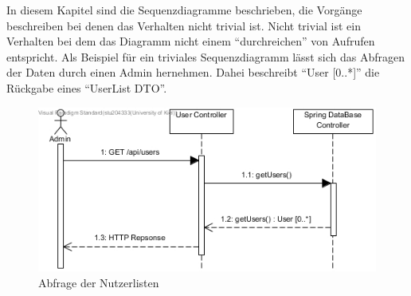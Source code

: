 
In diesem Kapitel sind die Sequenzdiagramme beschrieben, die Vorgänge beschreiben bei denen das Verhalten nicht trivial ist.
Nicht trivial ist ein Verhalten bei dem das Diagramm nicht einem ``durchreichen'' von Aufrufen entspricht.
Als Beispiel für ein triviales Sequenzdiagramm lässt sich das Abfragen der Daten durch einen Admin hernehmen. Dahei
beschreibt ``User [0..*]'' die Rückgabe eines ``UserList DTO''.
\begin{figure}[H]
	\centering
	\includegraphics[width = 12cm]{img/diagrams/TrivialDiagram}
	\caption{Abfrage der Nutzerlisten}
\end{figure}
 
